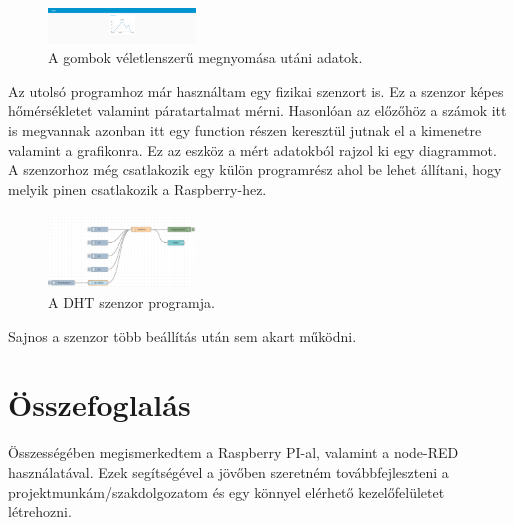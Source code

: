 \documentclass[a4paper,12pt,oneside]{report}
\begin{document}
\begin{figure}[htbp]
	\centering
	\includegraphics[width=0.35\textwidth]{fig/chart.png}
	\caption{A gombok véletlenszerű megnyomása utáni adatok.}
	\label{fig-chart}
\end{figure}

Az utolsó programhoz már használtam egy fizikai szenzort is. Ez a szenzor képes hőmérsékletet valamint páratartalmat mérni.
Hasonlóan az előzőhöz a számok itt is megvannak azonban itt egy function részen keresztül jutnak el a kimenetre valamint a 
grafikonra. Ez az eszköz a mért adatokból rajzol ki egy diagrammot. A szenzorhoz még csatlakozik egy külön programrész ahol be lehet
állítani, hogy melyik pinen csatlakozik a Raspberry-hez.

\begin{figure}[htbp]
	\centering
	\includegraphics[width=0.35\textwidth]{fig/dht.png}
	\caption{A DHT szenzor programja.}
	\label{fig-dht}
\end{figure}

Sajnos a szenzor több beállítás után sem akart működni.

\chapter{Összefoglalás}

Összességében megismerkedtem a Raspberry PI-al, valamint a node-RED használatával. Ezek segítségével a jövőben szeretném 
továbbfejleszteni a projektmunkám/szakdolgozatom és egy könnyel elérhető kezelőfelületet létrehozni.
\end{document}

